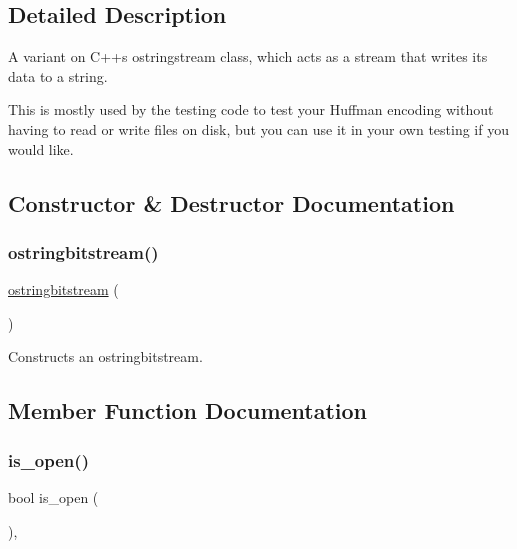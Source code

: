 \subsection{Detailed Description}
A variant on C++\textquotesingle{}s ostringstream class, which acts as a stream that writes its data to a string. 

This is mostly used by the testing code to test your Huffman encoding without having to read or write files on disk, but you can use it in your own testing if you would like. 

\subsection{Constructor \& Destructor Documentation}
\mbox{\label{classostringbitstream_a923b090c481c5ae2d59a45a4ebac5a24}} 
\subsubsection{\texorpdfstring{ostringbitstream()}{ostringbitstream()}}
{\footnotesize\ttfamily \mbox{\hyperlink{classostringbitstream}{ostringbitstream}} (\begin{DoxyParamCaption}{ }\end{DoxyParamCaption})}



Constructs an ostringbitstream. 



\subsection{Member Function Documentation}
\mbox{\label{classobitstream_a2f57f54d8c03b615bb31eee091d8a88a}} 
\subsubsection{\texorpdfstring{is\+\_\+open()}{is\_open()}}
{\footnotesize\ttfamily bool is\+\_\+open (\begin{DoxyParamCaption}{ }\end{DoxyParamCaption})\hspace{0.3cm}{\ttfamily [virtual]}, {\ttfamily [inherited]}}



